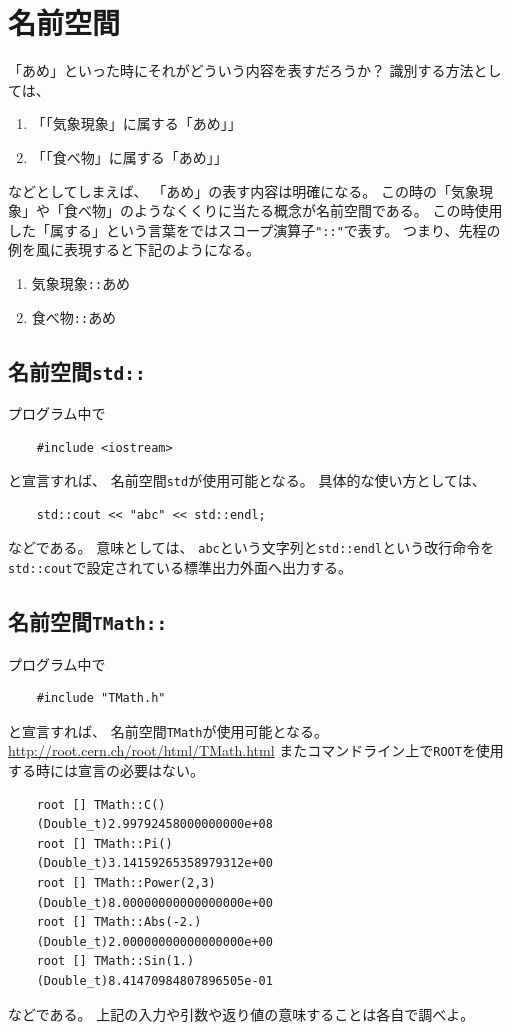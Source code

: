 \documentclass{jarticle}
\begin{document}
 \section{名前空間\label{sec:namespace}}


 「あめ」といった時にそれがどういう内容を表すだろうか？
 識別する方法としては、
 \begin{enumerate}
  \item 「「気象現象」に属する「あめ」」
  \item「「食べ物」に属する「あめ」」
 \end{enumerate}
 などとしてしまえば、
 「あめ」の表す内容は明確になる。
 この時の「気象現象」や「食べ物」のようなくくりに当たる概念が名前空間である。
 この時使用した「属する」という言葉を\Cpp ではスコープ演算子\verb|"::"|で表す。
 つまり、先程の例を\Cpp 風に表現すると下記のようになる。
 \begin{enumerate}
  \item 気象現象\verb|::|あめ
  \item 食べ物\verb|::|あめ
 \end{enumerate}

  \subsection{名前空間\texttt{std::}}
  プログラム中で
\begin{verbatim}
	#include <iostream>
\end{verbatim}
と宣言すれば、
名前空間\texttt{std}が使用可能となる。
具体的な使い方としては、
\begin{verbatim}
	std::cout << "abc" << std::endl;
\end{verbatim}
などである。
意味としては、
\verb|abc|という文字列と\verb|std::endl|という改行命令を\verb|std::cout|で設定されている標準出力外面へ出力する。


  \subsection{名前空間\texttt{TMath::}}
  プログラム中で
\begin{verbatim}
	#include "TMath.h"
\end{verbatim}
と宣言すれば、
名前空間\texttt{TMath}が使用可能となる。
\url{http://root.cern.ch/root/html/TMath.html}
またコマンドライン上で\verb|ROOT|を使用する時には宣言の必要はない。
\begin{verbatim}
	root [] TMath::C()
	(Double_t)2.99792458000000000e+08
	root [] TMath::Pi()
	(Double_t)3.14159265358979312e+00
	root [] TMath::Power(2,3)
	(Double_t)8.00000000000000000e+00
	root [] TMath::Abs(-2.)
	(Double_t)2.00000000000000000e+00
	root [] TMath::Sin(1.)
	(Double_t)8.41470984807896505e-01
\end{verbatim}
などである。
上記の入力や引数や返り値の意味することは各自で調べよ。
\end{document}
